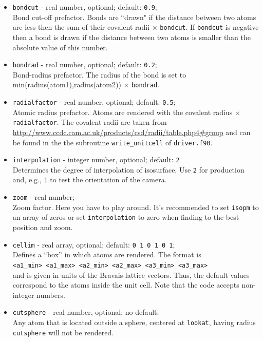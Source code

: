 \documentclass[
  notitlepage,
  twoside,
   prb,
  floatfix,
]{revtex4-1}
\begin{document}
\begin{itemize}
\item
{\tt bondcut} - real number, optional; default: {\tt 0.9}; \\
Bond cut-off prefactor. Bonds are ``drawn" if the distance between two atoms are less then the sum of their covalent radii $\times$ {\tt bondcut}. If {\tt bondcut} is negative then a bond is drawn if the distance between two atoms is smaller than the absolute value of this number.

\item
{\tt bondrad} - real number, optional; default: {\tt 0.2}; \\
Bond-radius prefactor. The radius of the bond is set to min(radius(atom1),radius(atom2)) $\times$ {\tt bondrad}.

\item
{\tt radialfactor} - real number, optional; default: {\tt 0.5}; \\
Atomic radius prefactor. Atoms are rendered with the covalent radius $\times$ {\tt radialfactor}. The covalent radii are taken from \url{http://www.ccdc.cam.ac.uk/products/csd/radii/table.php4#group} and can be found in the the subroutine {\tt write\_unitcell} of {\tt driver.f90}.

\item
{\tt interpolation} - integer number, optional; default: {\tt 2}\\
Determines the degree of interpolation of isosurface. Use {\tt 2} for production and, e.g., {\tt 1} to test the orientation of the camera. 

\item 
{\tt zoom} - real number;\\
Zoom factor. Here you have to play around. It's recommended to set {\tt isopm} to an array of zeros or set {\tt interpolation} to zero when finding to the best position and zoom.

\item 
{\tt cellim} - real array, optional; default: {\tt 0\ 1\ 0\ 1\ 0\ 1}; \\
Defines a ``box'' in which atoms are rendered. The format is \\
{\tt <a1\_min> <a1\_max> <a2\_min> <a2\_max> <a3\_min> <a3\_max>} \\
and is given in units of the Bravais lattice vectors. Thus, the default values correspond to the atoms inside the unit cell. Note that the code accepts non-integer numbers.

\item 
{\tt cutsphere} - real number, optional; no default; \\
Any atom that is located outside a sphere, centered at {\tt lookat}, having radius {\tt cutsphere} will not be rendered.


\end{itemize}
\end{document}
